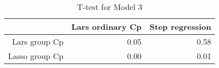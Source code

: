 \begin{table}[ht]
\centering
\begin{tabular}{rrr}
  \hline
 & Lars ordinary Cp & Step regression \\ 
  \hline
Lars group Cp & 0.05 & 0.58 \\ 
  Lasso group Cp & 0.00 & 0.01 \\ 
   \hline
\end{tabular}
\caption{T-test for Model 3} 
\end{table}
